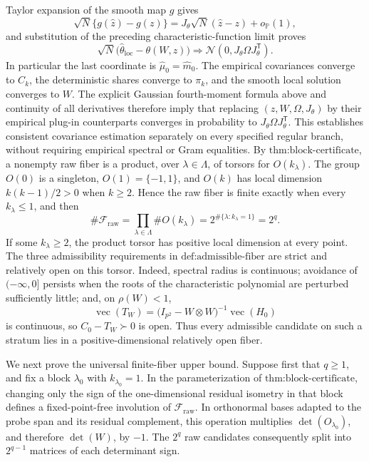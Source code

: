Taylor expansion of the smooth map \(g\) gives
\[
 \sqrt N\{g(\widehat z)-g(z)\}
 =J_\theta\sqrt N(\widehat z-z)+o_{\mathbb P}(1),
\]
and substitution of the preceding characteristic-function limit proves
\[
 \sqrt N\bigl(\widehat\theta_{\mathrm{loc}}-\theta(W,z)\bigr)
 \Longrightarrow\mathcal N(0,J_\theta\Omega J_\theta^{\mathsf T}).
\]
In particular the last coordinate is \(\widehat\mu_0=\widehat m_0\).  The empirical covariances converge to \(C_k\), the deterministic shares converge to \(\pi_k\), and the smooth local solution converges to \(W\).  The explicit Gaussian fourth-moment formula above and continuity of all derivatives therefore imply that replacing \((z,W,\Omega,J_\theta)\) by their empirical plug-in counterparts converges in probability to \(J_\theta\Omega J_\theta^{\mathsf T}\).  This establishes consistent covariance estimation separately on every specified regular branch, without requiring empirical spectral or Gram equalities.
By \(\text{thm:block-certificate}\), a nonempty raw fiber is a product, over \(\lambda\in\Lambda\), of torsors for \(O(k_\lambda)\).  The group \(O(0)\) is a singleton, \(O(1)=\{-1,1\}\), and \(O(k)\) has local dimension \(k(k-1)/2>0\) when \(k\geq2\).  Hence the raw fiber is finite exactly when every \(k_\lambda\leq1\), and then
\[
 \#\mathcal F_{\mathrm{raw}}
 =\prod_{\lambda\in\Lambda}\#O(k_\lambda)
 =2^{\#\{\lambda:k_\lambda=1\}}=2^q.
\]
If some \(k_\lambda\geq2\), the product torsor has positive local dimension at every point.  The three admissibility requirements in \(\text{def:admissible-fiber}\) are strict and relatively open on this torsor.  Indeed, spectral radius is continuous; avoidance of \(( -\infty,0]\) persists when the roots of the characteristic polynomial are perturbed sufficiently little; and, on \(\rho(W)<1\),
\[
 \operatorname{vec}(T_W)
 =\bigl(I_{p^2}-W\otimes W\bigr)^{-1}\operatorname{vec}(H_0)
\]
is continuous, so \(C_0-T_W\succ0\) is open.  Thus every admissible candidate on such a stratum lies in a positive-dimensional relatively open fiber.

We next prove the universal finite-fiber upper bound.  Suppose first that \(q\geq1\), and fix a block \(\lambda_0\) with \(k_{\lambda_0}=1\).  In the parameterization of \(\text{thm:block-certificate}\), changing only the sign of the one-dimensional residual isometry in that block defines a fixed-point-free involution of \(\mathcal F_{\mathrm{raw}}\).  In orthonormal bases adapted to the probe span and its residual complement, this operation multiplies \(\det(O_{\lambda_0})\), and therefore \(\det(W)\), by \(-1\).  The \(2^q\) raw candidates consequently split into \(2^{q-1}\) matrices of each determinant sign.

